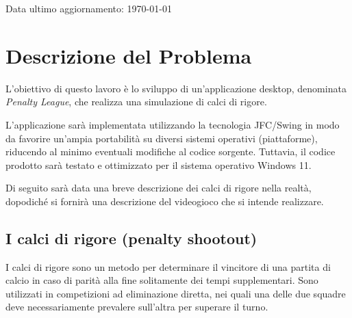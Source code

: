 \documentclass[12pt,a4paper]{report}
\begin{document}
\begin{titlepage}

	\vfill
	\raggedright
	\small{Data ultimo aggiornamento: \today\newline}
\end{titlepage}
\restoregeometry

\tableofcontents

\chapter{Descrizione del Problema}\label{ch:despro}
L’obiettivo di questo lavoro è lo sviluppo di un’applicazione desktop, denominata \emph{Penalty League}, che realizza una simulazione di calci di rigore.

L’applicazione sarà implementata utilizzando la tecnologia JFC/Swing in modo da favorire un’ampia portabilità su diversi sistemi operativi (piattaforme), riducendo al minimo eventuali modifiche al codice sorgente. Tuttavia, il codice prodotto sarà testato e ottimizzato per il sistema operativo Windows 11.

Di seguito sarà data una breve descrizione dei calci di rigore nella realtà, dopodiché si fornirà una descrizione del videogioco che si intende realizzare.
\section{I calci di rigore (penalty shootout)}\label{se:gal}
I calci di rigore sono un metodo per determinare il vincitore di una partita di calcio in caso di parità alla fine solitamente dei tempi supplementari. Sono utilizzati in competizioni ad eliminazione diretta, nei quali una delle due squadre deve necessariamente prevalere sull'altra per superare il turno.
\end{document}
